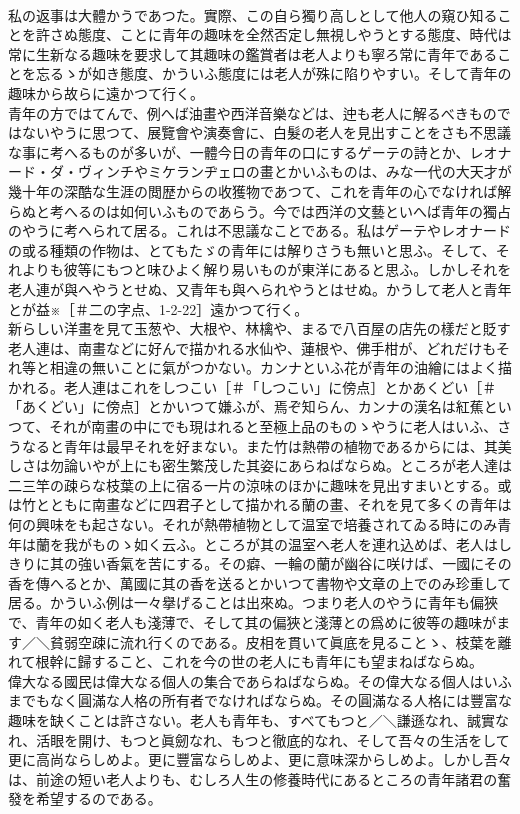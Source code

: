 \documentclass[8pt]{extreport}
\begin{document}
\begin{CJK}{UTF8}{min}
\\	私の返事は大體かうであつた。實際、この自ら獨り高しとして他人の窺ひ知ることを許さぬ態度、ことに青年の趣味を全然否定し無視しやうとする態度、時代は常に生新なる趣味を要求して其趣味の鑑賞者は老人よりも寧ろ常に青年であることを忘るゝが如き態度、かういふ態度には老人が殊に陷りやすい。そして青年の趣味から故らに遠かつて行く。
\\	青年の方ではてんで、例へば油畫や西洋音樂などは、迚も老人に解るべきものではないやうに思つて、展覽會や演奏會に、白髮の老人を見出すことをさも不思議な事に考へるものが多いが、一體今日の青年の口にするゲーテの詩とか、レオナード・ダ・ヴィンチやミケランヂェロの畫とかいふものは、みな一代の大天才が幾十年の深酷な生涯の閲歴からの收獲物であつて、これを青年の心でなければ解らぬと考へるのは如何いふものであらう。今では西洋の文藝といへば青年の獨占のやうに考へられて居る。これは不思議なことである。私はゲーテやレオナードの或る種類の作物は、とてもたゞの青年には解りさうも無いと思ふ。そして、それよりも彼等にもつと味ひよく解り易いものが東洋にあると思ふ。しかしそれを老人連が與へやうとせぬ、又青年も與へられやうとはせぬ。かうして老人と青年とが益※［＃二の字点、1-2-22］遠かつて行く。
\\	新らしい洋畫を見て玉葱や、大根や、林檎や、まるで八百屋の店先の樣だと貶す老人連は、南畫などに好んで描かれる水仙や、蓮根や、佛手柑が、どれだけもそれ等と相違の無いことに氣がつかない。カンナといふ花が青年の油繪にはよく描かれる。老人連はこれをしつこい［＃「しつこい」に傍点］とかあくどい［＃「あくどい」に傍点］とかいつて嫌ふが、焉ぞ知らん、カンナの漢名は紅蕉といつて、それが南畫の中にでも現はれると至極上品のものゝやうに老人はいふ、さうなると青年は最早それを好まない。また竹は熱帶の植物であるからには、其美しさは勿論いやが上にも密生繁茂した其姿にあらねばならぬ。ところが老人達は二三竿の疎らな枝葉の上に宿る一片の涼味のほかに趣味を見出すまいとする。或は竹とともに南畫などに四君子として描かれる蘭の畫、それを見て多くの青年は何の興味をも起さない。それが熱帶植物として温室で培養されてゐる時にのみ青年は蘭を我がものゝ如く云ふ。ところが其の温室へ老人を連れ込めば、老人はしきりに其の強い香氣を苦にする。その癖、一輪の蘭が幽谷に咲けば、一國にその香を傳へるとか、萬國に其の香を送るとかいつて書物や文章の上でのみ珍重して居る。かういふ例は一々擧げることは出來ぬ。つまり老人のやうに青年も偏狹で、青年の如く老人も淺薄で、そして其の偏狹と淺薄との爲めに彼等の趣味がます／＼貧弱空疎に流れ行くのである。皮相を貫いて眞底を見ることゝ、枝葉を離れて根幹に歸すること、これを今の世の老人にも青年にも望まねばならぬ。
\\	偉大なる國民は偉大なる個人の集合であらねばならぬ。その偉大なる個人はいふまでもなく圓滿な人格の所有者でなければならぬ。その圓滿なる人格には豐富な趣味を缺くことは許さない。老人も青年も、すべてもつと／＼謙遜なれ、誠實なれ、活眼を開け、もつと眞劒なれ、もつと徹底的なれ、そして吾々の生活をして更に高尚ならしめよ。更に豐富ならしめよ、更に意味深からしめよ。しかし吾々は、前途の短い老人よりも、むしろ人生の修養時代にあるところの青年諸君の奮發を希望するのである。

\end{CJK}
\end{document}
